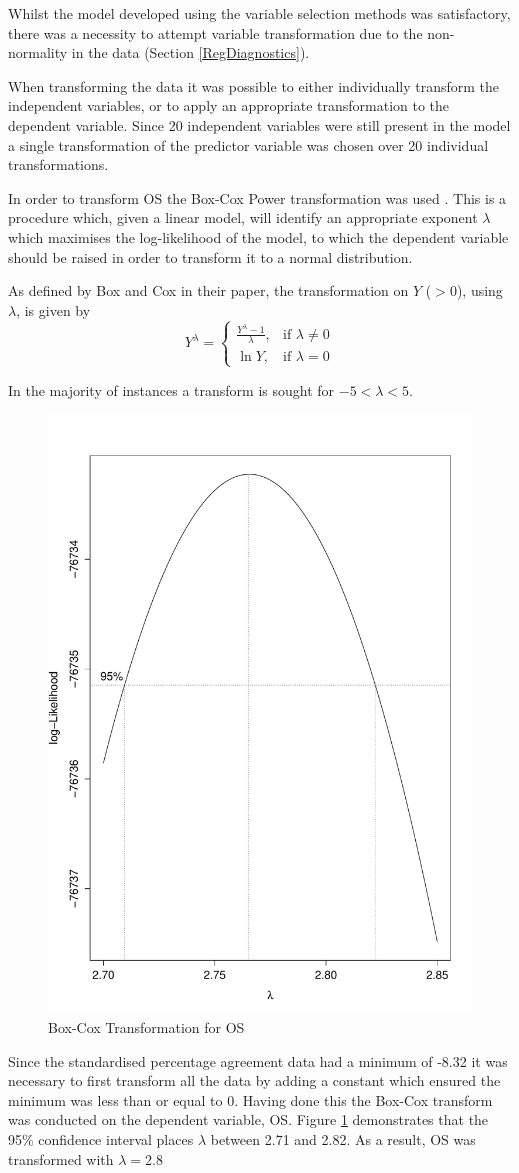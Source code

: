\documentclass[11pt,a4paper]{report}
\begin{document}
Whilst the model developed using the variable selection methods was satisfactory, there was a necessity to attempt variable transformation due to the non-normality in the data (Section \ref{RegDiagnostics}). 

When transforming the data it was possible to either individually transform the independent variables, or to apply an appropriate transformation to the dependent variable. Since 20 independent variables were still present in the model a single transformation of the predictor variable was chosen over 20 individual transformations. 

In order to transform \ac{OS} the Box-Cox Power transformation was used \cite{box1964analysis}. This is a procedure which, given a linear model, will identify an appropriate exponent $\lambda$ which maximises the log-likelihood of the model, to which the dependent variable should be raised in order to transform it to a normal distribution. 

As defined by Box and Cox in their paper, the transformation on $Y$ ($>0$), using $\lambda$, is given by
\[      Y^{\lambda}= 
\begin{cases}
\frac{Y^{\lambda}-1}{\lambda},& \text{if } \lambda \neq 0\\
\ln{Y},              & \text{if } \lambda = 0
\end{cases}
\]

In the majority of instances a transform is sought for $ -5 < \lambda < 5 $. 

\begin{figure}[H]
	\centering
	\includegraphics[width=0.4\linewidth]{images/BoxCoxTrans}
	\caption{Box-Cox Transformation for OS}
	\label{fig:BoxCox}
\end{figure}

Since the standardised percentage agreement data had a minimum of -8.32 it was necessary to first transform all the data by adding a constant which ensured the minimum was less than or equal to 0. Having done this the Box-Cox transform was conducted on the dependent variable, \ac{OS}. Figure \ref{fig:BoxCox} demonstrates that the 95\% confidence interval places $\lambda$ between 2.71 and 2.82. As a result, \ac{OS} was transformed with $\lambda = 2.8$
\end{document}

